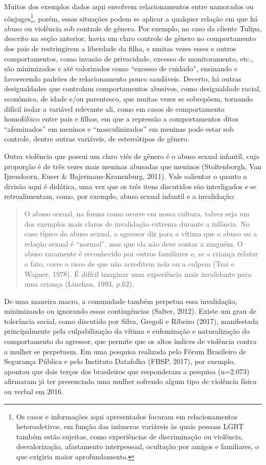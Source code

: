 Muitos dos exemplos dados aqui envolvem relacionamentos entre namorados ou cônjuges\footnote{Os casos e informações aqui apresentados focaram em relacionamentos heteroafetivos, em função das inúmeras variáveis às quais pessoas LGBT também estão sujeitas, como experiências de discriminação ou violência, desvalorização, afastamento interpessoal, ocultação por amigos e familiares, o que exigiria maior aprofundamento.}, porém, essas situações podem se aplicar a qualquer relação em que há abuso ou violência sob controle de gênero. Por exemplo, no caso da cliente Tulipa, descrito na seção anterior, havia um claro controle de gênero no comportamento dos pais de restringirem a liberdade da filha, e muitas vezes esses e outros comportamentos, como invasão de privacidade, excesso de monitoramento, etc., são minimizados e até valorizados como ``excesso de cuidado'', ensinando e favorecendo padrões de relacionamento pouco saudáveis. Decerto, há outras desigualdades que controlam comportamentos abusivos, como desigualdade racial, econômica, de idade e/ou parentesco, que muitas vezes se sobrepõem, tornando difícil isolar a variável relevante ali, como em casos de comportamento homofóbico entre pais e filhos, em que a repressão a comportamentos ditos ``afeminados'' em meninos e ``masculinizados'' em meninas pode estar sob controle, dentre outras variáveis, de estereótipos de gênero.

Outra violência que possui um claro viés de gênero é o abuso sexual infantil, cuja proporção é de três vezes mais meninas abusadas que meninos (Stoltenborgh, Van Ijzendoorn, Euser \& Bajermans-Kranenburg, 2011). Vale salientar o quanto a divisão aqui é didática, uma vez que os três itens discutidos são interligados e se retroalimentam, como, por exemplo, abuso sexual infantil e a invalidação:

\begin{quote}
    O abuso sexual, na forma como ocorre em nossa cultura, talvez seja um dos exemplos mais claros de invalidação extrema durante a infância. No caso típico do abuso sexual, o agressor diz para a vítima que o abuso ou a relação sexual é ``normal'', mas que ela não deve contar a ninguém. O abuso raramente é reconhecido por outros familiares e, se a criança relatar o fato, corre o risco de que não acreditem nela ou a culpem (Tsai e Wagner, 1978). É difícil imaginar uma experiência mais invalidante para uma criança (Linehan, 1993, p.62).
\end{quote}

De uma maneira macro, a comunidade também perpetua essa invalidação, minimizando ou ignorando essas contingências (Salter, 2012). Existe um grau de tolerância social, como discutido por Silva, Gregoli e Ribeiro (2017), manifestada principalmente pela culpabilização da vítima e eufemização e naturalização do comportamento do agressor, que permite que os altos índices de violência contra a mulher se perpetuem. Em uma pesquisa realizada pelo Fórum Brasileiro de Segurança Pública e pelo Instituto Datafolha (FBSP, 2017), por exemplo, apontou que dois terços dos brasileiros que responderam a pesquisa (n=2.073) afirmaram já ter presenciado uma mulher sofrendo algum tipo de violência física ou verbal em 2016.

